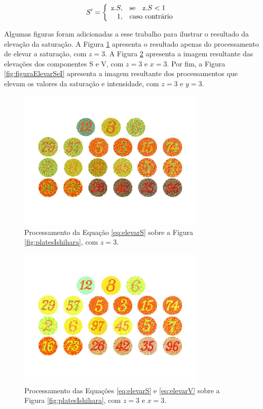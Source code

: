\documentclass[	12pt, Times, openright, twoside, a4paper, english, brazil]{abntex2}
\begin{document}
\begin{equation}
\label{eq:elevarS}
S'=\left\{
\begin{array}{rl}
       $z$ . S,&\mbox{se}\quad $z$ . S < 1 \\
       1,&\mbox{caso contrário}
\end{array}\right.
\end{equation}

Algumas figuras foram adicionadas a esse trabalho para ilustrar o resultado da elevação da saturação. A Figura \ref{fig:figuraElevarS} apresenta o resultado apenas do processamento de elevar a saturação, com $z=3$. A Figura \ref{fig:figuraElevarSeV} apresenta a imagem resultante das elevações dos componentes S e V, com $z = 3$ e $x = 3$. Por fim, a Figura \ref{fig:figuraElevarSeI} apresenta a imagem resultante dos processamentos que elevam os valores da saturação e intensidade, com $z = 3$ e $y = 3$.

\begin{figure}[!htb]
\centering \includegraphics[width=0.80\textwidth]{figuraElevarS.jpg}
\caption{Processamento da Equação \ref{eq:elevarS} sobre a Figura \ref{fig:platesIshihara}, com $z = 3$. \label{fig:figuraElevarS}}
\end{figure}

\begin{figure}[!htb]
\centering \includegraphics[width=0.80\textwidth]{figuraElevarSeV.jpg}
\caption{Processamento das Equações \ref{eq:elevarS} e \ref{eq:elevarV} sobre a Figura \ref{fig:platesIshihara}, com $z = 3$ e $x = 3$. \label{fig:figuraElevarSeV}}
\end{figure}
\end{document}
